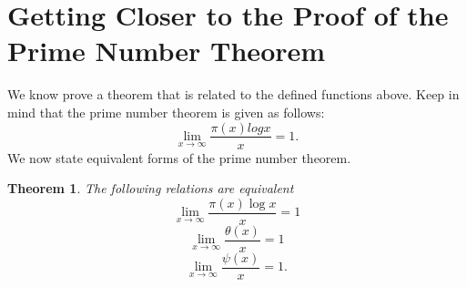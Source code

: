 \documentclass[12pt,letterpaper]{book}
\newtheorem{theorem}{Theorem}
\begin{document}
\section{Getting Closer to the Proof of the Prime Number Theorem}

We know prove a theorem that is related to the defined functions
above.  Keep in mind that the prime number theorem is given as
follows:
\begin{equation*}
\lim_{x \rightarrow \infty} \frac{\pi(x)logx}{x}=1.
\end{equation*}
We now state equivalent forms of the prime number theorem.
\begin{theorem}
The following relations are equivalent
\begin{equation}\label{3}
\lim_{x\rightarrow \infty}\frac{\pi(x)\log x}{x}=1
\end{equation}
\begin{equation}\label{4}
\lim_{x\rightarrow \infty} \frac{\theta(x)}{x}= 1
\end{equation}
\begin{equation}\label{5}
\lim_{x\rightarrow \infty} \frac{\psi(x)}{x}= 1.
\end{equation}
\end{theorem}
\end{document}
